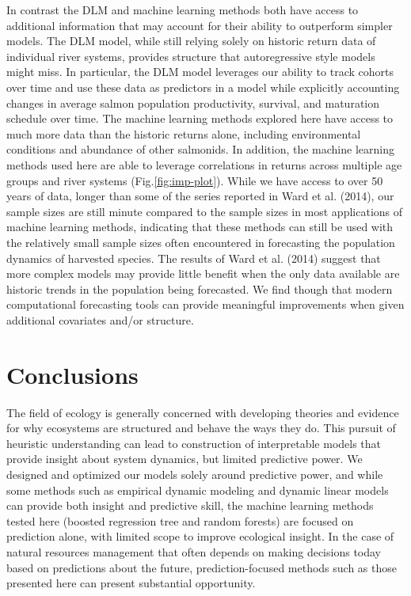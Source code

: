 \documentclass[
]{article}
\begin{document}
In contrast the DLM and machine learning methods both have access to additional information that may account for their ability to outperform simpler models. The DLM model, while still relying solely on historic return data of individual river systems, provides structure that autoregressive style models might miss. In particular, the DLM model leverages our ability to track cohorts over time and use these data as predictors in a model while explicitly accounting changes in average salmon population productivity, survival, and maturation schedule over time. The machine learning methods explored here have access to much more data than the historic returns alone, including environmental conditions and abundance of other salmonids. In addition, the machine learning methods used here are able to leverage correlations in returns across multiple age groups and river systems (Fig.\ref{fig:imp-plot}). While we have access to over 50 years of data, longer than some of the series reported in Ward et al. (2014), our sample sizes are still minute compared to the sample sizes in most applications of machine learning methods, indicating that these methods can still be used with the relatively small sample sizes often encountered in forecasting the population dynamics of harvested species. The results of Ward et al. (2014) suggest that more complex models may provide little benefit when the only data available are historic trends in the population being forecasted. We find though that modern computational forecasting tools can provide meaningful improvements when given additional covariates and/or structure.

\hypertarget{conclusions}{%
\section*{Conclusions}\label{conclusions}}

The field of ecology is generally concerned with developing theories and evidence for why ecosystems are structured and behave the ways they do. This pursuit of heuristic understanding can lead to construction of interpretable models that provide insight about system dynamics, but limited predictive power. We designed and optimized our models solely around predictive power, and while some methods such as empirical dynamic modeling and dynamic linear models can provide both insight and predictive skill, the machine learning methods tested here (boosted regression tree and random forests) are focused on prediction alone, with limited scope to improve ecological insight. In the case of natural resources management that often depends on making decisions today based on predictions about the future, prediction-focused methods such as those presented here can present substantial opportunity.
\end{document}
